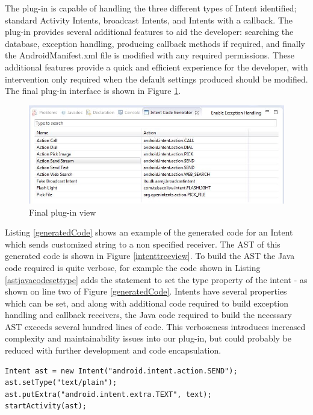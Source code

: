 The plug-in is capable of handling the three different types of Intent identified; standard Activity Intents, broadcast Intents, and Intents with a callback. The plug-in provides several additional features to aid the developer: searching the database, exception handling, producing callback methods if required, and finally the AndroidManifest.xml file is modified with any required permissions. These additional features provide a quick and efficient experience for the developer, with intervention only required when the default settings produced should be modified. The final plug-in interface is shown in Figure \ref{codegeneratorview}.

\begin{figure}[t]
\label{codegeneratorview}
  \centering
    \includegraphics[width=\textwidth]{codegenerator}
  \caption{Final plug-in view}
\end{figure}

Listing \ref{generatedCode} shows an example of the generated code for an Intent which sends customized string to a non specified receiver. The AST of this generated code is shown in Figure \ref{intenttreeview}. To build the AST the Java code required is quite verbose, for example the code shown in Listing \ref{astjavacodesettype} adds the statement to set the type property of the intent - as shown on line two of Figure \ref{generatedCode}. Intents have several properties which can be set, and along with additional code required to build exception handling and callback receivers, the Java code required to build the necessary AST exceeds several hundred lines of code. This verboseness introduces increased complexity and maintainability issues into our plug-in, but could probably be reduced with further development and code encapsulation.

{\footnotesize\begin{lstlisting}[label=generatedCode,caption=Generated code of an Intent]
Intent ast = new Intent("android.intent.action.SEND");
ast.setType("text/plain");
ast.putExtra("android.intent.extra.TEXT", text);
startActivity(ast);		
\end{lstlisting}}

